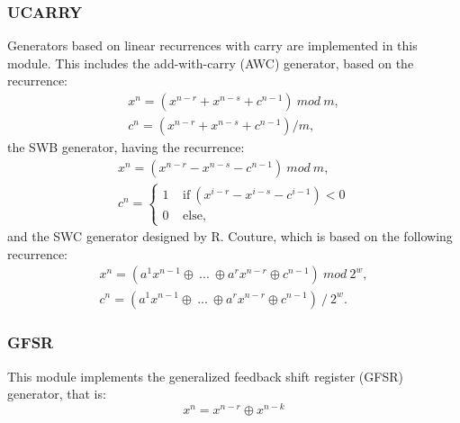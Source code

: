 \documentclass[10pt, conference, compsocconf]{IEEEtran}
\begin{document}
\subsubsection{UCARRY}
Generators based on linear recurrences with carry are implemented in this module. This includes the add-with-carry (AWC) generator, based on the recurrence:
\begin{equation}
\label{AWC}
\begin{array}{l}
x^n = (x^{n-r} + x^{n-s} + c^{n-1})~mod~m, \\
c^n= (x^{n-r} + x^{n-s} + c^{n-1}) / m, \end{array}\end{equation}
the SWB generator, having the recurrence:
\begin{equation}
\label{SWB}
\begin{array}{l}
x^n = (x^{n-r} - x^{n-s} - c^{n-1})~mod~m, \\
c^n=\left\{
\begin{array}{l}
1 ~~~~~\text{if}~ (x^{i-r} - x^{i-s} - c^{i-1})<0\\
0 ~~~~~\text{else},\end{array} \right. \end{array}\end{equation}
and the SWC generator designed by R. Couture, which is based on the following recurrence:
\begin{equation}
\label{SWC}
\begin{array}{l}
x^n = (a^1x^{n-1} \oplus ~...~ \oplus a^rx^{n-r} \oplus c^{n-1}) ~ mod ~ 2^w, \\
c^n = (a^1x^{n-1} \oplus ~...~ \oplus a^rx^{n-r} \oplus c^{n-1}) ~ / ~ 2^w. \end{array}\end{equation}

\subsubsection{GFSR}
This module implements the generalized feedback shift register (GFSR) generator, that is:
\begin{equation}
x^n = x^{n-r} \oplus x^{n-k}
\label{GFSR}
\end{equation}
\end{document}
